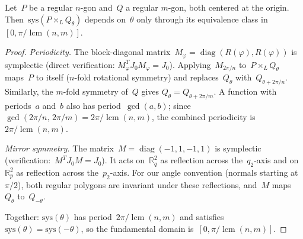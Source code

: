 \begin{unverified}
\begin{lemma}
\label{lem:rotation-fundamental-domain}
Let~$P$ be a regular $n$-gon and~$Q$ a regular $m$-gon, both centered at the
origin. Then~$\mathrm{sys}(P \times_L Q_\theta)$ depends on~$\theta$ only
through its equivalence class in~$[0, \pi/\operatorname{lcm}(n,m)]$.
\end{lemma}

\begin{proof}
\emph{Periodicity.}
The block-diagonal matrix~$M_\varphi = \operatorname{diag}(R(\varphi),
R(\varphi))$ is symplectic (direct verification: $M_\varphi^T J_0 M_\varphi
= J_0$). Applying~$M_{2\pi/n}$ to~$P \times_L Q_\theta$
maps~$P$ to itself ($n$-fold rotational symmetry)
and replaces~$Q_\theta$ with~$Q_{\theta + 2\pi/n}$. Similarly, the $m$-fold symmetry of~$Q$
gives $Q_\theta = Q_{\theta + 2\pi/m}$. A function with periods~$a$
and~$b$ also has period~$\gcd(a,b)$; since
$\gcd(2\pi/n,\, 2\pi/m) = 2\pi/\operatorname{lcm}(n,m)$,
the combined periodicity is~$2\pi/\operatorname{lcm}(n,m)$.

\emph{Mirror symmetry.}
The matrix~$M = \operatorname{diag}(-1, 1, -1, 1)$ is symplectic
(verification:~$M^T J_0 M = J_0$). It acts on~$\mathbb{R}^2_q$ as reflection
across the~$q_2$-axis and on~$\mathbb{R}^2_p$ as reflection across
the~$p_2$-axis. For our angle convention (normals starting at~$\pi/2$), both
regular polygons are invariant under these reflections, and~$M$
maps~$Q_\theta$ to~$Q_{-\theta}$.

Together: $\mathrm{sys}(\theta)$ has period~$2\pi/\operatorname{lcm}(n,m)$ and
satisfies~$\mathrm{sys}(\theta) = \mathrm{sys}(-\theta)$, so the fundamental
domain is~$[0, \pi/\operatorname{lcm}(n,m)]$.
\end{proof}
\end{unverified}


